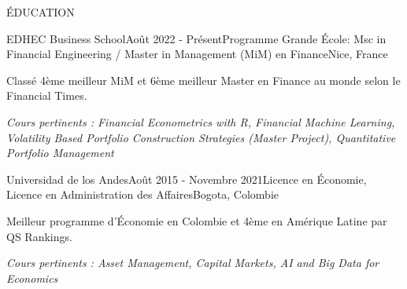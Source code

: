 \documentclass{resume} %
\begin{document}
%
%

\begin{rSection}{ÉDUCATION}

\begin{rSubsection}{EDHEC Business School}{Août 2022 - Présent}{Programme Grande École: Msc in Financial Engineering / Master in Management (MiM) en Finance}{Nice, France}
    \item Classé 4ème meilleur MiM et 6ème meilleur Master en Finance au monde selon le Financial Times.
    \item \textit{Cours pertinents : Financial Econometrics with R, Financial Machine Learning, Volatility Based Portfolio Construction Strategies (Master Project), Quantitative Portfolio Management}
\end{rSubsection}

\begin{rSubsection}{Universidad de los Andes}{Août 2015 - Novembre 2021}{Licence en Économie, Licence en Administration des Affaires}{Bogota, Colombie}
    \item Meilleur programme d'Économie en Colombie et 4ème en Amérique Latine par QS Rankings.
    \item \textit{Cours pertinents : Asset Management, Capital Markets, AI and Big Data for Economics}
\end{rSubsection}

\end{rSection}


%
%
\end{document}
